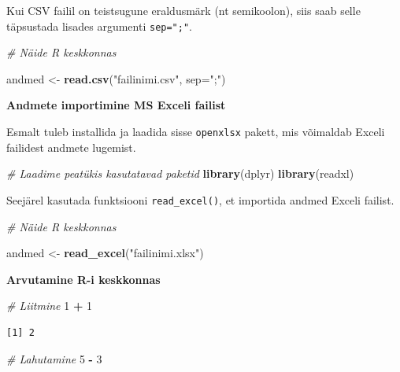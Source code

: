 \documentclass[
]{book}
\newenvironment{Shaded}{\begin{snugshade}}{\end{snugshade}}
\newcommand{\AttributeTok}[1]{\textcolor[rgb]{0.13,0.29,0.53}{#1}}
\newcommand{\CommentTok}[1]{\textcolor[rgb]{0.56,0.35,0.01}{\textit{#1}}}
\newcommand{\DecValTok}[1]{\textcolor[rgb]{0.00,0.00,0.81}{#1}}
\newcommand{\FunctionTok}[1]{\textcolor[rgb]{0.13,0.29,0.53}{\textbf{#1}}}
\newcommand{\NormalTok}[1]{#1}
\newcommand{\OtherTok}[1]{\textcolor[rgb]{0.56,0.35,0.01}{#1}}
\newcommand{\SpecialCharTok}[1]{\textcolor[rgb]{0.81,0.36,0.00}{\textbf{#1}}}
\newcommand{\StringTok}[1]{\textcolor[rgb]{0.31,0.60,0.02}{#1}}
\renewenvironment{Shaded} {\begin{snugshade}\footnotesize} {\end{snugshade}}
\begin{document}
Kui CSV failil on teistsugune eraldusmärk (nt semikoolon), siis saab selle täpsustada lisades argumenti \texttt{sep=";"}.

\begin{Shaded}
\begin{Highlighting}[]
\CommentTok{\# Näide R keskkonnas}

\NormalTok{andmed }\OtherTok{\textless{}{-}} \FunctionTok{read.csv}\NormalTok{(}\StringTok{"failinimi.csv"}\NormalTok{, }\AttributeTok{sep=}\StringTok{";"}\NormalTok{)}
\end{Highlighting}
\end{Shaded}

\textbf{Andmete importimine MS Exceli failist}

Esmalt tuleb installida ja laadida sisse \texttt{openxlsx} pakett, mis võimaldab Exceli failidest andmete lugemist.

\begin{Shaded}
\begin{Highlighting}[]
\CommentTok{\# Laadime peatükis kasutatavad paketid}
\FunctionTok{library}\NormalTok{(dplyr)}
\FunctionTok{library}\NormalTok{(readxl)}
\end{Highlighting}
\end{Shaded}

Seejärel kasutada funktsiooni \texttt{read\_excel()}, et importida andmed Exceli failist.

\begin{Shaded}
\begin{Highlighting}[]
\CommentTok{\# Näide R keskkonnas}

\NormalTok{andmed }\OtherTok{\textless{}{-}} \FunctionTok{read\_excel}\NormalTok{(}\StringTok{"failinimi.xlsx"}\NormalTok{)}
\end{Highlighting}
\end{Shaded}

\textbf{Arvutamine R-i keskkonnas}

\begin{Shaded}
\begin{Highlighting}[]
\CommentTok{\# Liitmine}
\DecValTok{1} \SpecialCharTok{+} \DecValTok{1}
\end{Highlighting}
\end{Shaded}

\begin{verbatim}
[1] 2
\end{verbatim}

\begin{Shaded}
\begin{Highlighting}[]
\CommentTok{\# Lahutamine}
\DecValTok{5} \SpecialCharTok{{-}} \DecValTok{3}
\end{Highlighting}
\end{Shaded}
\end{document}
